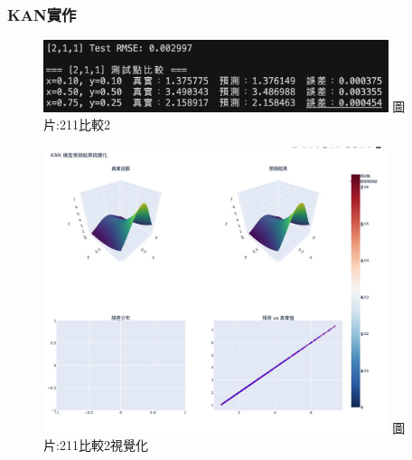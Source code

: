 \documentclass{beamer}
\begin{document}
\begin{frame}
    \frametitle{KAN實作}
    \begin{figure}
        \centering
        \begin{minipage}{\textwidth}
            \includegraphics[width=0.9\textwidth,height=0.4\textheight,keepaspectratio]{figures/211比較2.jpg}
            \centering
            圖片:211比較2
        \end{minipage}
        
        \vspace{0.5em}
        
        \begin{minipage}{\textwidth}
            \includegraphics[width=0.9\textwidth,height=0.5\textheight,keepaspectratio]{figures/211比較2視覺化.jpg}
            \centering
            圖片:211比較2視覺化
        \end{minipage}
    \end{figure}
\end{frame}
\end{document}
